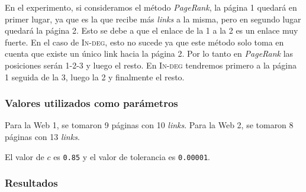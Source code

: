 			En el experimento, si consideramos el método \emph{PageRank}, la página 1 quedará en primer lugar, ya que es la que recibe más \emph{links} a la misma, pero en segundo lugar quedará la página 2. Esto se debe a que el enlace de la 1 a la 2 es un enlace muy fuerte. En el caso de \textsc{In-deg}, esto no sucede ya que este método solo toma en cuenta que existe un único link hacia la página 2. Por lo tanto en \emph{PageRank} las posiciones serán 1-2-3 y luego el resto. En \textsc{In-deg} tendremos primero a la página 1 seguida de la 3, luego la 2 y finalmente el resto.

			\subsubsection*{Valores utilizados como parámetros}
			Para la Web 1, se tomaron 9 páginas con 10 \emph{links}. Para la Web 2, se tomaron 8 páginas con 13 \emph{links}.  

			El valor de $c$ es \texttt{0.85} y el valor de tolerancia es \texttt{0.00001}. 
			 		
			\subsubsection*{Resultados}

